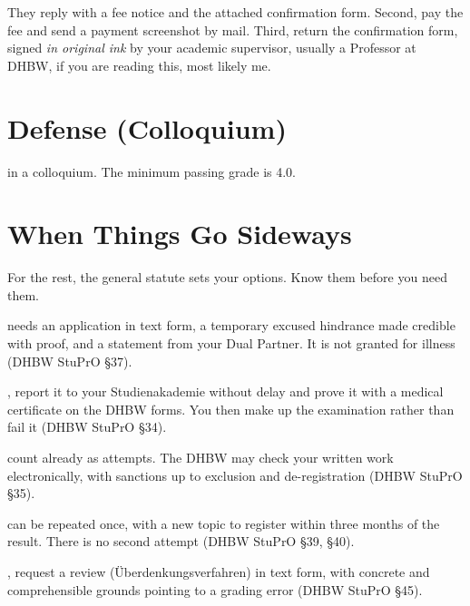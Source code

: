 \documentclass{../sharedAssets/tufte}
\begin{document}
They reply with a fee notice and the attached confirmation form.
Second, pay the fee and send a payment screenshot by mail.
Third, return the confirmation form, signed \emph{in original ink} by your academic supervisor, usually a Professor at DHBW,
if you are reading this, most likely me.



\section{Defense (Colloquium)}
 in a colloquium.
The minimum passing grade is 4.0.


\section{When Things Go Sideways}
For the rest, the general statute sets your options.
Know them before you need them.

 needs an application in text form, a temporary excused
hindrance made credible with proof, and a statement from your Dual Partner.
It is not granted for illness (DHBW StuPrO \S37).

, report it to your Studienakademie without delay and
prove it with a medical certificate on the DHBW forms.
You then make up the examination rather than fail it (DHBW StuPrO \S34).

 count already as attempts.
The DHBW may check your written work electronically, with sanctions up to exclusion and
de-registration (DHBW StuPrO \S35).

 can be repeated once, with a new topic to register within
three months of the result.
There is no second attempt (DHBW StuPrO \S39, \S40).

, request a review (\"Uberdenkungsverfahren) in text form,
with concrete and comprehensible grounds pointing to a grading error (DHBW StuPrO \S45).
\end{document}
